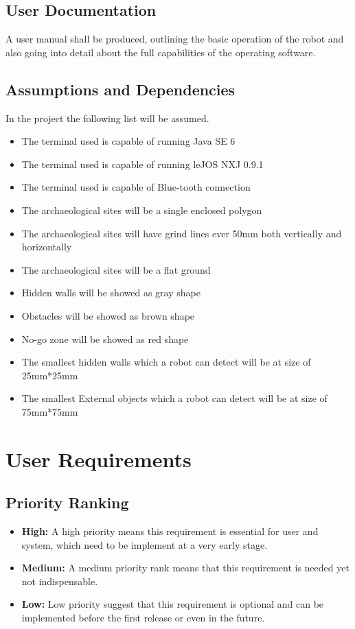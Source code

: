 \documentclass[11pt, a4paper]{report}
\begin{document}
\section{User Documentation}
A user manual shall be produced, outlining the basic operation of the robot and also going into detail about the full capabilities of the operating software.


\section{Assumptions and Dependencies}
In the project the following list will be assumed.

\begin{itemize}
  \item{The terminal used is capable of running Java SE 6}
  \item{The terminal used is capable of running leJOS NXJ 0.9.1}
  \item{The terminal used is capable of Blue-tooth connection}
  \item{The archaeological sites will be a single enclosed polygon}
  \item{The archaeological sites will have grind lines ever 50mm both vertically and horizontally}
  \item{The archaeological sites will be a flat ground}
  \item{Hidden walls will be showed as gray shape}
  \item{Obstacles will be showed as brown shape}
  \item{No-go zone will be showed as red shape}
  \item{The smallest hidden walls which a robot can detect will be at size of 25mm*25mm}
  \item{The smallest External objects which a robot can detect will be at size of 75mm*75mm}
\end{itemize}


\pagebreak



\chapter{User Requirements}
\section{Priority Ranking}
\begin{itemize}
  \item{\textbf{High: }} A high priority means this requirement is essential for user and system, which need to be implement at a very early stage.
  \item{\textbf{Medium: }} A medium priority rank means that this requirement is needed yet not indispensable.
  \item{\textbf{Low: }} Low priority suggest that this requirement is optional and can be implemented before the first release or even in the future. 
\end{itemize}
\end{document}
